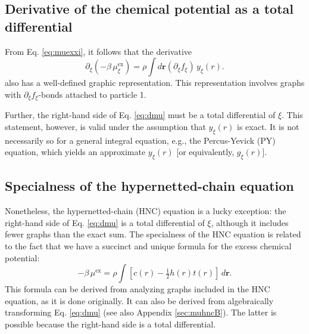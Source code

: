 \documentclass[preprint]{revtex4-1}
\newcommand{\vct}[1]{\mathbf{#1}}
\providecommand{\vr}{} %
\renewcommand{\vr}{\vct{r}}
\newcommand{\supex}[1]{ { { #1 }^{ \mathrm{ex} } } }
\newcommand{\muex}{\supex{\mu}}
\newcommand{\muexxi}{\mu^{ \mathrm{ex} }_\xi}
\begin{document}
\subsection{Derivative of the chemical potential as a total differential}



From Eq. \eqref{eq:muexxi}, it follows that the derivative
\begin{equation}
  \partial_\xi (-\beta \, \muexxi)
  = \rho \int d\vr (\partial_\xi f_\xi) \, y_\xi(r).
\label{eq:dmu}
\end{equation}
also has a well-defined graphic representation.
%
This representation involves graphs with $\partial_\xi f_\xi$-bonds
attached to particle 1.

Further, the right-hand side of Eq. \eqref{eq:dmu}
must be a total differential of $\xi$.
%
This statement, however, is valid under the assumption that
$y_\xi(r)$ is exact.
%
It is not necessarily so for a general integral equation,
e.g., the Percus-Yevick (PY) equation\cite{percusyevick},
which yields an approximate $y_\xi(r)$ [or equivalently, $g_\xi(r)$].





\subsection{Specialness of the hypernetted-chain equation}



Nonetheless,
  the hypernetted-chain (HNC) equation\cite{
  morita1958, morita1959, morita1960, vanleeuwen1959, green1960, verlet1960, rushbrooke1960}
  is a lucky exception:
the right-hand side of Eq. \eqref{eq:dmu} is a total differential of $\xi$,
  although it includes fewer graphs than the exact sum.
%
The specialness of the HNC equation is related to the fact that
%
we have a succinct and unique formula\cite{morita1960, singer1985}
for the excess chemical potential:
\begin{equation}
  -\beta \, \muex
=
  \rho \int
  \left[ c(r) - \tfrac{1}{2} h(r) t(r) \right] \, d\vr.
\label{eq:muhnc}
\end{equation}
%
This formula can be derived from analyzing graphs included in the HNC equation,
as it is done originally\cite{morita1960}.
%
It can also be derived from algebraically transforming Eq. \eqref{eq:dmu}\cite{singer1985}
(see also Appendix \ref{sec:muhncB}).
%
The latter is possible because the right-hand side is a total differential.
\end{document}
